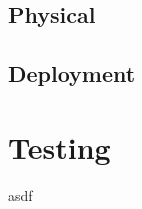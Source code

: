 \documentclass[11pt]{article}
\begin{document}
\subsection{Physical}

\subsection{Deployment}

\section{Testing}
asdf
\end{document}

